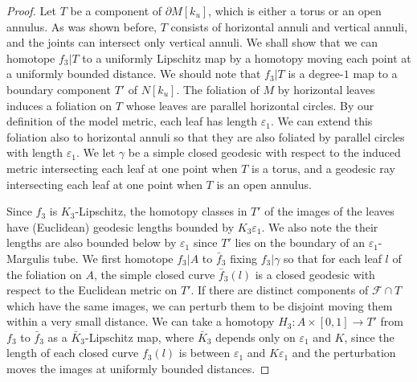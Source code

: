 \documentclass{amsart}
\newtheorem{lemma}[theorem]{Lemma}
\theoremstyle{definition}
\numberwithin{figure}{section}
\numberwithin{equation}{section}
\begin{document}

\begin{proof}
Let $T$ be a component of  $\partial M[k_u]$, which is either a torus or an open annulus.
As was shown before, $T$ consists of horizontal annuli and vertical annuli, and the joints can intersect only vertical annuli.
We shall show that we can homotope $f_3|T$ to a uniformly Lipschitz map by a homotopy moving each point at a uniformly bounded distance.
We should note that $f_3|T$ is a degree-$1$ map to a boundary component $T'$ of $N[k_u]$.
The foliation of $M$ by horizontal leaves induces  a foliation on $T$ whose leaves are parallel horizontal circles.
By our definition of the model metric, each leaf has length $\varepsilon_1$.
We can extend this foliation also to horizontal annuli so that they are also foliated by parallel circles with length $\varepsilon_1$.
We let $\gamma$ be a  simple closed geodesic with respect to the induced metric intersecting each leaf at one point when $T$ is a torus, and a geodesic ray intersecting each leaf at one point when $T$ is an open annulus.

Since $f_3$ is $K_3$-Lipschitz, the homotopy classes in $T'$ of the images of the leaves have (Euclidean) geodesic lengths bounded by $K_3 \varepsilon_1$.
We also note the their lengths are also bounded below by $\varepsilon_1$ since $T'$ lies on the boundary of an $\varepsilon_1$-Margulis tube.
We first homotope $f_3|A$ to $\bar f_3$ fixing $f_3|\gamma$ so that for each leaf $l$ of the foliation on $A$, the simple closed curve $\bar f_3(l)$ is a closed geodesic with respect to the Euclidean metric on $T'$.
If there are distinct components of $\mathcal F \cap T$ which have the same images, we can perturb them to be disjoint moving them within a very small distance.
We can take a homotopy $H_3: A \times [0,1] \rightarrow T'$ from $f_3$ to $\bar f_3$ as a $\bar K_3$-Lipschitz map, where $\bar K_3$ depends only on $\varepsilon_1$ and $K$, since the length of each closed curve $f_3(l)$ is between $\varepsilon_1$ and $K \varepsilon_1$ and the perturbation moves the images at uniformly bounded distances.





\end{proof}
\end{document}
